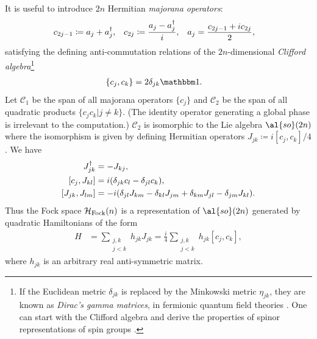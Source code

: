 It is useful to introduce $2n$ Hermitian \emph{majorana operators}:
\begin{align}
c_{2j-1} &\coloneqq a_j + a_j^{\dagger}, &
c_{2j}&\coloneqq \frac{a_j - a_j^{\dagger}}{i}, &
a_j &= \frac{c_{2j-1} + ic_{2j}}{2},
\end{align}
satisfying the defining anti-commutation relations of the $2n$-dimensional \emph{Clifford algebra}\footnote{If the Euclidean metric $\delta_{jk}$ is replaced by the Minkowski metric $\eta_{jk}$, they are known as \emph{Dirac's gamma matrices}, in fermionic quantum field theories \cite{Peskin}. One can start with the Clifford algebra and derive the properties of spinor representations of spin groups \cite{FH}.}
\begin{align}
\{c_j,c_k\} &= 2\delta_{jk}\id.
\end{align}
Let $\mathcal{C}_1$ be the span of all majorana operators $\{c_j\}$ and $\mathcal{C}_2$ be the span of all quadratic products $\{c_jc_k|j \neq k\}$. (The identity operator generating a global phase is irrelevant to the computation.) $\mathcal{C}_2$ is isomorphic to the Lie algebra $\al{so}(2n)$ where the isomorphism is given by defining Hermitian operators $J_{jk} \coloneqq i[c_j,c_k]/4$. We have
\begin{align}
J_{jk}\dgg &= -J_{kj}, \\
[c_j,J_{kl}] &= i(\delta_{jk}c_l - \delta_{jl}c_k), \label{adjoint-commutation-relation} \\
[J_{jk},J_{lm}] &= -i(\delta_{jl}J_{km} - \delta_{kl}J_{jm} + \delta_{km}J_{jl} - \delta_{jm}J_{kl}).
\label{so(n)-commutation-relation}
\end{align}
Thus the Fock space
$\mathcal{H}_{\text{Fock}}(n)$ is a representation of $\al{so}(2n)$ generated by quadratic Hamiltonians of the form
\begin{align}\label{quadratic-hamiltonian}
H &= \sum_{\substack{j,k \\ j<k}} h_{jk} J_{jk}
= \frac{i}{4} \sum_{\substack{j,k \\ j<k}} h_{jk} [c_j,c_k],
\end{align}
where $h_{jk}$ is an arbitrary real anti-symmetric matrix.

